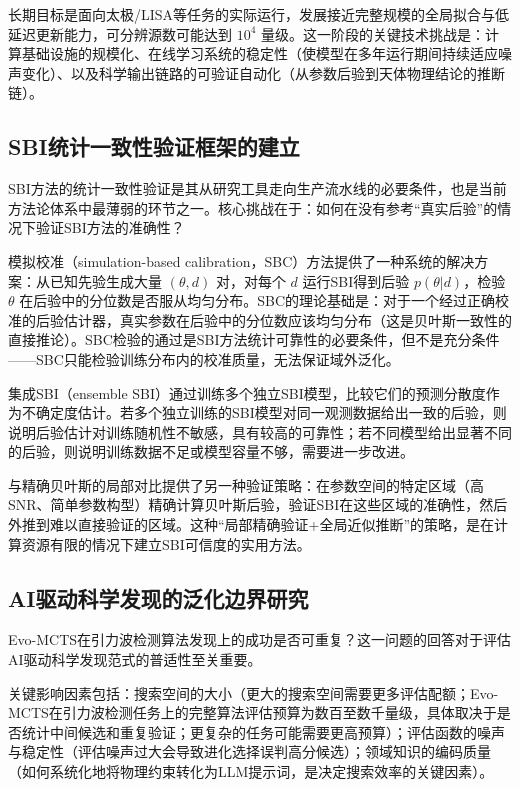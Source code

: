 长期目标是面向太极/LISA等任务的实际运行，发展接近完整规模的全局拟合与低延迟更新能力，可分辨源数可能达到 $10^4$ 量级。这一阶段的关键技术挑战是：计算基础设施的规模化、在线学习系统的稳定性（使模型在多年运行期间持续适应噪声变化）、以及科学输出链路的可验证自动化（从参数后验到天体物理结论的推断链）。

\subsection{SBI统计一致性验证框架的建立}

SBI方法的统计一致性验证是其从研究工具走向生产流水线的必要条件，也是当前方法论体系中最薄弱的环节之一。核心挑战在于：如何在没有参考“真实后验”的情况下验证SBI方法的准确性？

模拟校准（simulation-based calibration，SBC）方法提供了一种系统的解决方案：从已知先验生成大量 $(\theta, d)$ 对，对每个 $d$ 运行SBI得到后验 $p(\theta|d)$，检验 $\theta$ 在后验中的分位数是否服从均匀分布。SBC的理论基础是：对于一个经过正确校准的后验估计器，真实参数在后验中的分位数应该均匀分布（这是贝叶斯一致性的直接推论）。SBC检验的通过是SBI方法统计可靠性的必要条件，但不是充分条件——SBC只能检验训练分布内的校准质量，无法保证域外泛化。

集成SBI（ensemble SBI）通过训练多个独立SBI模型，比较它们的预测分散度作为不确定度估计。若多个独立训练的SBI模型对同一观测数据给出一致的后验，则说明后验估计对训练随机性不敏感，具有较高的可靠性；若不同模型给出显著不同的后验，则说明训练数据不足或模型容量不够，需要进一步改进。

与精确贝叶斯的局部对比提供了另一种验证策略：在参数空间的特定区域（高SNR、简单参数构型）精确计算贝叶斯后验，验证SBI在这些区域的准确性，然后外推到难以直接验证的区域。这种“局部精确验证+全局近似推断”的策略，是在计算资源有限的情况下建立SBI可信度的实用方法。

\subsection{AI驱动科学发现的泛化边界研究}

Evo-MCTS在引力波检测算法发现上的成功是否可重复？这一问题的回答对于评估AI驱动科学发现范式的普适性至关重要。

关键影响因素包括：搜索空间的大小（更大的搜索空间需要更多评估配额；Evo-MCTS在引力波检测任务上的完整算法评估预算为数百至数千量级，具体取决于是否统计中间候选和重复验证；更复杂的任务可能需要更高预算）；评估函数的噪声与稳定性（评估噪声过大会导致进化选择误判高分候选）；领域知识的编码质量（如何系统化地将物理约束转化为LLM提示词，是决定搜索效率的关键因素）。

